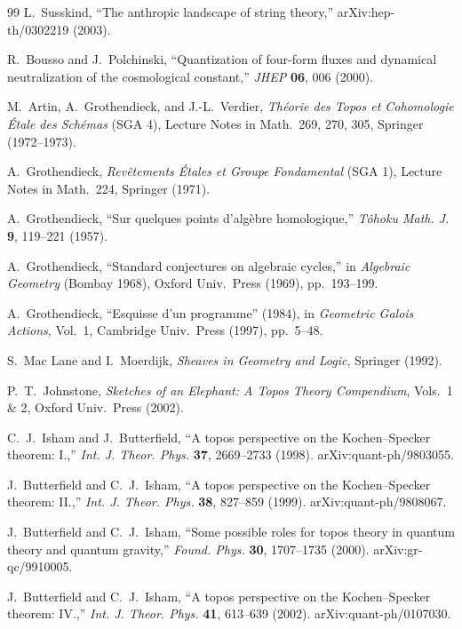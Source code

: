 \documentclass[12pt,a4paper]{article}
\theoremstyle{definition}
\begin{document}
\begin{thebibliography}{99}
L.~Susskind, ``The anthropic landscape of string theory,'' arXiv:hep-th/0302219 (2003).

R.~Bousso and J.~Polchinski, ``Quantization of four-form fluxes and dynamical neutralization of the cosmological constant,'' \textit{JHEP} \textbf{06}, 006 (2000).

M.~Artin, A.~Grothendieck, and J.-L.~Verdier, \textit{Th\'{e}orie des Topos et Cohomologie \'{E}tale des Sch\'{e}mas} (SGA 4), Lecture Notes in Math.~269, 270, 305, Springer (1972--1973).

A.~Grothendieck, \textit{Rev\^{e}tements \'{E}tales et Groupe Fondamental} (SGA 1), Lecture Notes in Math.~224, Springer (1971).

A.~Grothendieck, ``Sur quelques points d'alg\`{e}bre homologique,'' \textit{T\^{o}hoku Math. J.} \textbf{9}, 119--221 (1957).

A.~Grothendieck, ``Standard conjectures on algebraic cycles,'' in \textit{Algebraic Geometry} (Bombay 1968), Oxford Univ.~Press (1969), pp.~193--199.

A.~Grothendieck, ``Esquisse d'un programme'' (1984), in \textit{Geometric Galois Actions}, Vol.~1, Cambridge Univ.~Press (1997), pp.~5--48.

S.~Mac Lane and I.~Moerdijk, \textit{Sheaves in Geometry and Logic}, Springer (1992).

P.~T.~Johnstone, \textit{Sketches of an Elephant: A Topos Theory Compendium}, Vols.~1 \& 2, Oxford Univ.~Press (2002).

C.~J.~Isham and J.~Butterfield, ``A topos perspective on the Kochen--Specker theorem: I.,'' \textit{Int. J. Theor. Phys.} \textbf{37}, 2669--2733 (1998). arXiv:quant-ph/9803055.

J.~Butterfield and C.~J.~Isham, ``A topos perspective on the Kochen--Specker theorem: II.,'' \textit{Int. J. Theor. Phys.} \textbf{38}, 827--859 (1999). arXiv:quant-ph/9808067.

J.~Butterfield and C.~J.~Isham, ``Some possible roles for topos theory in quantum theory and quantum gravity,'' \textit{Found. Phys.} \textbf{30}, 1707--1735 (2000). arXiv:gr-qc/9910005.

J.~Butterfield and C.~J.~Isham, ``A topos perspective on the Kochen--Specker theorem: IV.,'' \textit{Int. J. Theor. Phys.} \textbf{41}, 613--639 (2002). arXiv:quant-ph/0107030.


\end{thebibliography}
\end{document}

